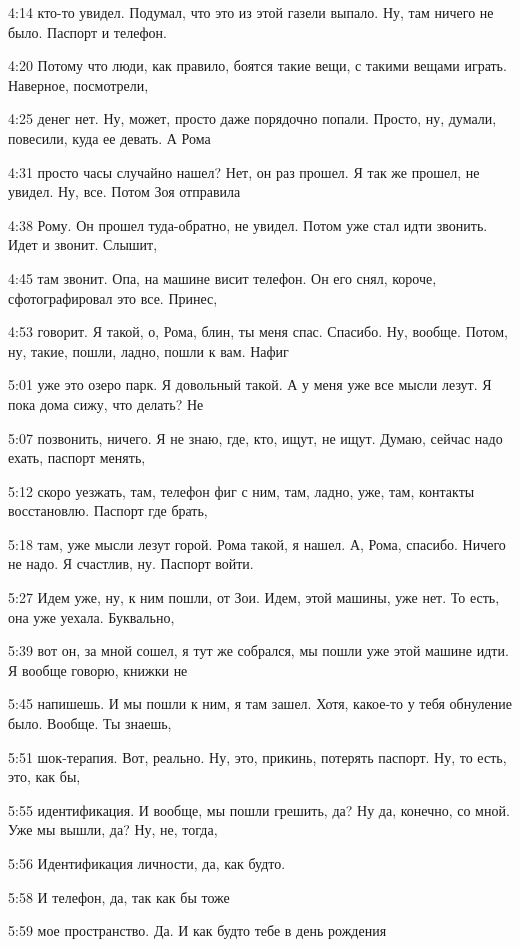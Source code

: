 4:14
кто-то увидел. Подумал, что это из этой газели выпало. Ну, там ничего не было. Паспорт и телефон.

4:20
Потому что люди, как правило, боятся такие вещи, с такими вещами играть. Наверное, посмотрели,

4:25
денег нет. Ну, может, просто даже порядочно попали. Просто, ну, думали, повесили, куда ее девать. А Рома

4:31
просто часы случайно нашел? Нет, он раз прошел. Я так же прошел, не увидел. Ну, все. Потом Зоя отправила

4:38
Рому. Он прошел туда-обратно, не увидел. Потом уже стал идти звонить. Идет и звонит. Слышит,

4:45
там звонит. Опа, на машине висит телефон. Он его снял, короче, сфотографировал это все. Принес,

4:53
говорит. Я такой, о, Рома, блин, ты меня спас. Спасибо. Ну, вообще. Потом, ну, такие, пошли, ладно, пошли к вам. Нафиг

5:01
уже это озеро парк. Я довольный такой. А у меня уже все мысли лезут. Я пока дома сижу, что делать? Не

5:07
позвонить, ничего. Я не знаю, где, кто, ищут, не ищут. Думаю, сейчас надо ехать, паспорт менять,

5:12
скоро уезжать, там, телефон фиг с ним, там, ладно, уже, там, контакты восстановлю. Паспорт где брать,

5:18
там, уже мысли лезут горой. Рома такой, я нашел. А, Рома, спасибо. Ничего не надо. Я счастлив, ну. Паспорт войти.

5:27
Идем уже, ну, к ним пошли, от Зои. Идем, этой машины, уже нет. То есть, она уже уехала. Буквально,

5:39
вот он, за мной сошел, я тут же собрался, мы пошли уже этой машине идти. Я вообще говорю, книжки не

5:45
напишешь. И мы пошли к ним, я там зашел. Хотя, какое-то у тебя обнуление было. Вообще. Ты знаешь,

5:51
шок-терапия. Вот, реально. Ну, это, прикинь, потерять паспорт. Ну, то есть, это, как бы,

5:55
идентификация. И вообще, мы пошли грешить, да? Ну да, конечно, со мной. Уже мы вышли, да? Ну, не, тогда,

5:56
Идентификация личности, да, как будто.

5:58
И телефон, да, так как бы тоже

5:59
мое пространство. Да. И как будто тебе в день рождения

